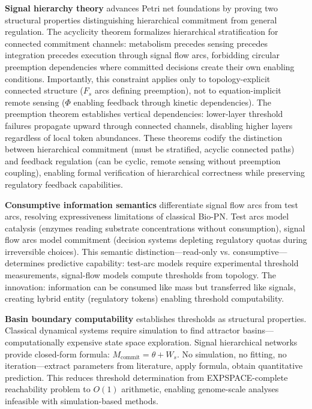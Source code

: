 \documentclass[10pt,letterpaper]{article}
\begin{document}
\textbf{Signal hierarchy theory} advances Petri net foundations by proving two structural properties distinguishing hierarchical commitment from general regulation. The acyclicity theorem formalizes hierarchical stratification for connected commitment channels: metabolism precedes sensing precedes integration precedes execution through signal flow arcs, forbidding circular preemption dependencies where committed decisions create their own enabling conditions. Importantly, this constraint applies only to topology-explicit connected structure ($F_s$ arcs defining preemption), not to equation-implicit remote sensing ($\Phi$ enabling feedback through kinetic dependencies). The preemption theorem establishes vertical dependencies: lower-layer threshold failures propagate upward through connected channels, disabling higher layers regardless of local token abundances. These theorems codify the distinction between hierarchical commitment (must be stratified, acyclic connected paths) and feedback regulation (can be cyclic, remote sensing without preemption coupling), enabling formal verification of hierarchical correctness while preserving regulatory feedback capabilities.

\textbf{Consumptive information semantics} differentiate signal flow arcs from test arcs, resolving expressiveness limitations of classical Bio-PN. Test arcs model catalysis (enzymes reading substrate concentrations without consumption), signal flow arcs model commitment (decision systems depleting regulatory quotas during irreversible choices). This semantic distinction---read-only vs. consumptive---determines predictive capability: test-arc models require experimental threshold measurements, signal-flow models compute thresholds from topology. The innovation: information can be consumed like mass but transferred like signals, creating hybrid entity (regulatory tokens) enabling threshold computability.

\textbf{Basin boundary computability} establishes thresholds as structural properties. Classical dynamical systems require simulation to find attractor basins---computationally expensive state space exploration. Signal hierarchical networks provide closed-form formula: $M_{\text{commit}} = \theta + W_s$. No simulation, no fitting, no iteration---extract parameters from literature, apply formula, obtain quantitative prediction. This reduces threshold determination from EXPSPACE-complete reachability problem to $O(1)$ arithmetic, enabling genome-scale analyses infeasible with simulation-based methods.
\end{document}
